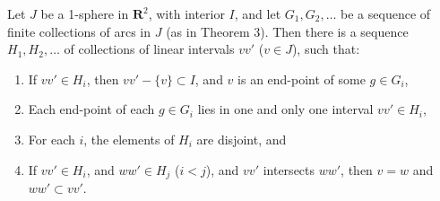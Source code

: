 Let $J$ be a 1-sphere in $\mathbf{R}^2$, with interior $I$, and let $G_1, G_2, \ldots$ be a sequence of finite collections of arcs in $J$ (as in Theorem 3). Then there is a sequence $H_1, H_2, \ldots$ of collections of linear intervals $vv'$ ($v \in J$), such that:
\begin{enumerate}
\item If $vv' \in H_i$, then $vv' - \{v\} \subset I$, and $v$ is an end-point of some $g \in G_i$,
\item Each end-point of each $g \in G_i$ lies in one and only one interval $vv' \in H_i$,
\item For each $i$, the elements of $H_i$ are disjoint, and
\item If $vv' \in H_i$, and $ww' \in H_j$ ($i < j$), and $vv'$ intersects $ww'$, then $v = w$ and $ww' \subset vv'$.
\end{enumerate}
